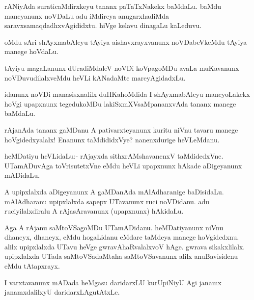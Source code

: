 \begin{mng}
rANiyAda suraticaMdirxkeyu tananx paTaTxNakekx baMdaLu. baMdu maneyanunx noVDaLu adu iMdireya anugarxhadiMda saravxsamaqdadhxvAgididxtu. hiVge kelavu dinagaLu kaLeduvu.
\end{mng}

\begin{mng}
oMdu sAri shAyxmabAleyu tAyiya aishavxrayxvanunx noVDabeVkeMdu tAyiya manege hoVdaLu.
\end{mng}

\begin{mng}
tAyiyu magaLanunx dUradiMdaleV noVDi koVpagoMDu avaLa muKavanunx noVDuvudilalxveMdu heVLi kANadaMte mareyAgidadxLu.
\end{mng}

\begin{mng}
idanunx noVDi manasisxnalilx duHKahoMdida I shAyxmabAleyu maneyoLakekx hoVgi upapxnunx tegedukoMDu lakiSxmXVsaMpananxvAda tananx manege baMdaLu.
\end{mng}

\begin{mng}
rAjanAda tananx gaMDanu A pativarxteyanunx kuritu niVnu tavaru manege hoVgidedxyalalx! Enanunx taMdididxVye? nanenxdurige heVLeMdanu.
\end{mng}

\begin{mng}
heMDatiyu heVLidaLu:- rAjayxda sithxrAMshavanenxV taMdidedxVne. UTamADuvAga toVrisutetxVne eMdu heVLi upapxnunx hAkade aDigeyanunx mADidaLu.
\end{mng}

\begin{mng}
A upipxlalxda aDigeyanunx A gaMDanAda mAlAdharanige baDisidaLu. mAlAdharanu upipxlalxda sapepx UTavanunx ruci noVDidanu. adu ruciyilalxdiralu A rAjasAravanunx (upapxnunx) hAkidaLu.
\end{mng}

\begin{mng}
Aga A rAjanu saMtoVSagoMDu UTamADidanu. heMDatiyanunx niVnu dhaneyx, dhaneyx, eMdu hogaLidanu eMdare taMdeya manege hoVgidedxnu. alilx upipxlalxda UTavu heVge gwravAhaRvalalxvoV hAge. gwrava sikakxlilalx. upipxlalxda UTada saMtoVSadaMtaha saMtoVSavanunx alilx anuBavisidenu eMdu tAtapxrayx.
\end{mng}

\begin{mng}
I varxtavanunx mADada heMgasu daridarxLU kurUpiNiyU Agi janamx janamxdalilxyU daridarxLAgutAtxLe.
\end{mng}

